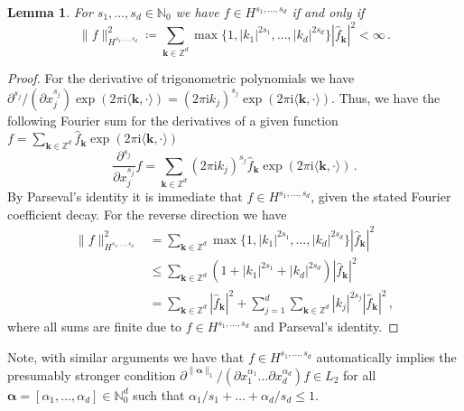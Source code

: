 \documentclass[a4paper]{scrartcl}
\numberwithin{equation}{section}
\newtheorem{lemma}[theorem]{Lemma}
\begin{document}
\begin{lemma}\label{lemma:Fouriercharacter} For $s_1,\dots,s_d\in\mathds N_0$ we have $f\in H^{s_1,\dots,s_d}$ if and only if
    \begin{equation}\label{eq:anisotropicnorm}
        \|f\|_{H^{s_1,\dots,s_d}}^2
        \coloneqq \sum_{\bm k\in\mathds Z^d} \max \{1, |k_1|^{2s_1}, \dots, |k_d|^{2s_d}\} | \hat f_{\bm k} |^2
        < \infty \,.
    \end{equation}
\end{lemma} 

\begin{proof} For the derivative of trigonometric polynomials we have $\partial^{s_j}/(\partial x_j^{s_j}) \exp(2\pi\mathrm i\langle\bm k, \cdot\rangle) = (2\pi\mathrm i k_j)^{s_j} \exp(2\pi\mathrm i\langle\bm k, \cdot\rangle)$.
    Thus, we have the following Fourier sum for the derivatives of a given function $f = \sum_{\bm k\in\mathds Z^d}\hat f_{\bm k}\exp(2\pi\mathrm i\langle\bm k,\cdot\rangle)$
    \begin{equation*}
        \frac{\partial^{s_j}}{\partial x_j^{s_j}} f
        = \sum_{\bm k\in\mathds Z^d} (2\pi\mathrm i k_j)^{s_j} \hat f_{\bm k} \exp(2\pi\mathrm i\langle\bm k,\cdot\rangle) \,.
    \end{equation*}
    By Parseval's identity it is immediate that $f\in H^{s_1,\dots,s_d}$, given the stated Fourier coefficient decay.
    For the reverse direction we have
    \begin{align*}
        \|f\|_{H^{s_1,\dots,s_d}}^2
        &= \sum_{\bm k\in\mathds Z^d} \max \{1, |k_1|^{2s_1}, \dots, |k_d|^{2s_d}\} | \hat f_{\bm k} |^2 \\
        &\le \sum_{\bm k\in\mathds Z^d} (1 + |k_1|^{2s_1} + |k_d|^{2s_d}) | \hat f_{\bm k} |^2 \\
        &= \sum_{\bm k\in\mathds Z^d} | \hat f_{\bm k} |^2 + \sum_{j=1}^{d} \sum_{\bm k\in\mathds Z^d} |k_j|^{2 s_j} | \hat f_{\bm k} |^2 \,,
    \end{align*}
    where all sums are finite due to $f\in H^{s_1,\dots,s_d}$ and Parseval's identity.
\end{proof} 

Note, with similar arguments we have that $f\in H^{s_1,\dots,s_d}$ automatically implies the presumably stronger condition $\partial^{\|\bm\alpha\|_1}/(\partial x_1^{\alpha_1} \dots \partial x_d^{\alpha_d}) f \in L_2$ for all $\bm\alpha = [\alpha_1,\dots,\alpha_d] \in \mathds N_0^d$ such that $\alpha_1/s_1+\dots+\alpha_d/s_d \le 1$.
\end{document}

